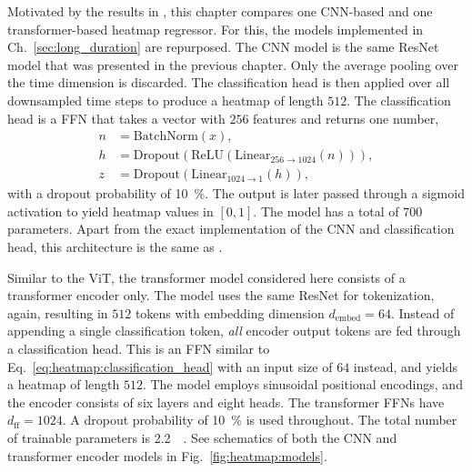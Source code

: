 Motivated by the results in \cite{Papalini_2025}, this chapter compares one CNN-based and one transformer-based heatmap regressor. For this, the models implemented in Ch.~\ref{sec:long_duration} are repurposed. The CNN model is the same ResNet model that was presented in the previous chapter. Only the average pooling over the time dimension is discarded. The classification head is then applied over all downsampled time steps to produce a heatmap of length $512$. The classification head is a FFN that takes a vector with $256$ features and returns one number, 
\begin{equation}
\begin{aligned}
	\label{eq:heatmap:classification_head}
	n &= \mathrm{BatchNorm}(x),\\
	h &= \mathrm{Dropout}(\mathrm{ReLU}(\mathrm{Linear}_{256\rightarrow1024}(n))),\\
	z &= \mathrm{Dropout}(\mathrm{Linear}_{1024\rightarrow1}(h)),
\end{aligned}
\end{equation}
with a dropout probability of \SI{10}{\percent}. The output is later passed through a sigmoid activation to yield heatmap values in $[0,1]$. The model has a total of \SI{700}{\kilo\nothing} parameters. Apart from the exact implementation of the CNN and classification head, this architecture is the same as \cite{PhysRevD.100.063015}.

Similar to the ViT, the transformer model considered here consists of a transformer encoder only. The model uses the same ResNet for tokenization, again, resulting in $512$ tokens with embedding dimension $d_\text{embed}=64$. Instead of appending a single classification token, \emph{all} encoder output tokens are fed through a classification head. This is an FFN similar to Eq.~\ref{eq:heatmap:classification_head} with an input size of $64$ instead, and yields a heatmap of length $512$. The model employs sinusoidal positional encodings, and the encoder consists of six layers and eight heads. The transformer FFNs have $d_\text{ff}=1024$. A dropout probability of \SI{10}{\percent} is used throughout. The total number of trainable parameters is \SI{2.2}{\mega\nothing}. See schematics of both the CNN and transformer encoder models in Fig.~\ref{fig:heatmap:models}. 

